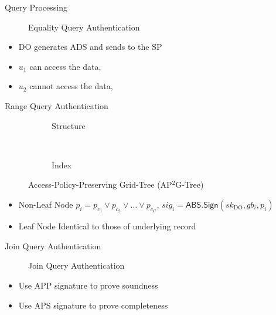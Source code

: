 \documentclass[xcolor={dvipsnames},aspectratio=169,10pt]{beamer}
\begin{document}
\begin{frame}{Query Processing}
  \begin{figure}
    \footnotesize
    \resizebox{.8\linewidth}{!}{}
    \caption{Equality Query Authentication}
  \end{figure}
  \begin{itemize}
    \item<1-> DO generates ADS and sends to the SP
    \item<2-> $u_1$ \alert{can access the data}, 
    \item<4-> $u_2$ \alert{cannot access the data},
  \end{itemize}
\end{frame}

\begin{frame}{Range Query Authentication}
  \begin{figure}
    \begin{subfigure}[b]{.5\linewidth}
      \centering
      \resizebox{\linewidth}{!}{}
      \caption{Structure}
    \end{subfigure}~%
    \begin{subfigure}[b]{.5\linewidth}
      \centering
      \resizebox{\linewidth}{!}{}
      \caption{Index}
    \end{subfigure}
    \caption{Access-Policy-Preserving Grid-Tree (AP$^2$G-Tree)}
  \end{figure}

  \begin{itemize}
    \item \alert{Non-Leaf Node} $p_i = p_{c_1}  \lor  p_{c_2}  \lor  \dots  \lor  p_{c_C}$, $sig_i = \textsf{ABS.Sign}({sk}_{\textrm{DO}}, gb_i , p_i)$
    \item \alert{Leaf Node} Identical to those of underlying record
  \end{itemize}
\end{frame}

\begin{frame}{Join Query Authentication}
  \begin{figure}
    \centering
    \resizebox{.65\linewidth}{!}{}
    \caption{Join Query Authentication}
  \end{figure}

  \begin{itemize}
    \item Use \alert{APP signature} to prove soundness
    \item Use \alert{APS signature} to prove completeness
  \end{itemize}
\end{frame}
\end{document}
